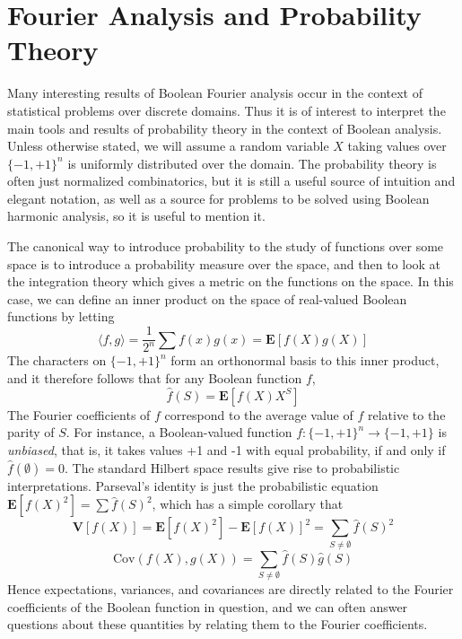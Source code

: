 \section{Fourier Analysis and Probability Theory}

Many interesting results of Boolean Fourier analysis occur in the context of statistical problems over discrete domains. Thus it is of interest to interpret the main tools and results of probability theory in the context of Boolean analysis. Unless otherwise stated, we will assume a random variable $X$ taking values over $\{ -1, +1 \}^n$ is uniformly distributed over the domain. The probability theory is often just normalized combinatorics, but it is still a useful source of intuition and elegant notation, as well as a source for problems to be solved using Boolean harmonic analysis, so it is useful to mention it.

The canonical way to introduce probability to the study of functions over some space is to introduce a probability measure over the space, and then to look at the integration theory which gives a metric on the functions on the space. In this case, we can define an inner product on the space of real-valued Boolean functions by letting
%
\[ \langle f, g \rangle = \frac{1}{2^n} \sum f(x)g(x) = \mathbf{E}[f(X)g(X)] \]
%
The characters on $\{ -1, +1 \}^n$ form an orthonormal basis to this inner product, and it therefore follows that for any Boolean function $f$,
%
\[ \widehat{f}(S) = \mathbf{E}[f(X)X^S] \]
%
The Fourier coefficients of $f$ correspond to the average value of $f$ relative to the parity of $S$. For instance, a Boolean-valued function $f: \{ -1, +1 \}^n \to \{ -1, +1 \}$ is {\it unbiased}, that is, it takes values +1 and -1 with equal probability, if and only if $\widehat{f}(\emptyset) = 0$. The standard Hilbert space results give rise to probabilistic interpretations. Parseval's identity is just the probabilistic equation $\mathbf{E}[f(X)^2] = \sum \widehat{f}(S)^2$, which has a simple corollary that
%
\[ \mathbf{V}[f(X)] = \mathbf{E}[f(X)^2] - \mathbf{E}[f(X)]^2 = \sum_{S \neq \emptyset} \widehat{f}(S)^2 \]
%
\[ \text{Cov}(f(X),g(X)) = \sum_{S \neq \emptyset} \widehat{f}(S) \widehat{g}(S) \]
%
Hence expectations, variances, and covariances are directly related to the Fourier coefficients of the Boolean function in question, and we can often answer questions about these quantities by relating them to the Fourier coefficients.

